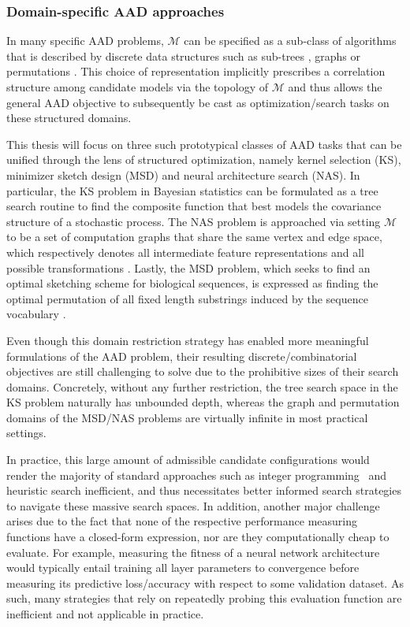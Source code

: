 \subsubsection{Domain-specific AAD approaches}
In many specific AAD problems, $\mathcal{M}$ can be specified as a sub-class of algorithms that is described by discrete data structures such as sub-trees \cite{Duvenaud13}, graphs \cite{he2020fednas, pham2018, bender2018understanding} or permutations \cite{marcais17}. This choice of representation implicitly prescribes a correlation structure among candidate models via the topology of $\mathcal{M}$ and thus allows the general AAD objective to subsequently be cast as optimization/search tasks on these structured domains. 

This thesis will focus on three such prototypical classes of AAD tasks that can be unified through the lens of structured optimization, namely kernel selection (KS), minimizer sketch design (MSD) and neural architecture search (NAS). In particular, the KS problem in Bayesian statistics \cite{Duvenaud13,Malkomes16} can be formulated as a tree search routine to find the composite function that best models the covariance structure of a stochastic process. The NAS problem is approached via setting $\mathcal{M}$ to be a set of computation graphs that share the same vertex and edge space, which respectively denotes all intermediate feature representations and all possible transformations \cite{zoph2016,pham2018}. Lastly, the MSD problem, which seeks to find an optimal sketching scheme for biological sequences, is expressed as finding the optimal permutation of all fixed length substrings induced by the sequence vocabulary \cite{marcais17,zheng20miniception,zheng21}.

Even though this domain restriction strategy has enabled more meaningful formulations of the AAD problem, their resulting discrete/combinatorial objectives are still challenging to solve due to the prohibitive sizes of their search domains. Concretely, without any further restriction, the tree search space in the KS problem naturally has unbounded depth, whereas the graph and permutation domains of the MSD/NAS problems are virtually infinite in most practical settings. 

In practice, this large amount of admissible candidate configurations would render the majority of standard approaches such as integer programming~\cite{balcan2017learning,balcan2018learning} and heuristic search inefficient, and thus necessitates better informed search strategies to navigate these massive search spaces. In addition, another major challenge arises due to the fact that none of the respective performance measuring functions have a closed-form expression, nor are they computationally cheap to evaluate. For example, measuring the fitness of a neural network architecture would typically entail training all layer parameters to convergence before measuring its predictive loss/accuracy with respect to some validation dataset. As such, many strategies that rely on repeatedly probing this evaluation function are inefficient and not applicable in practice. 


